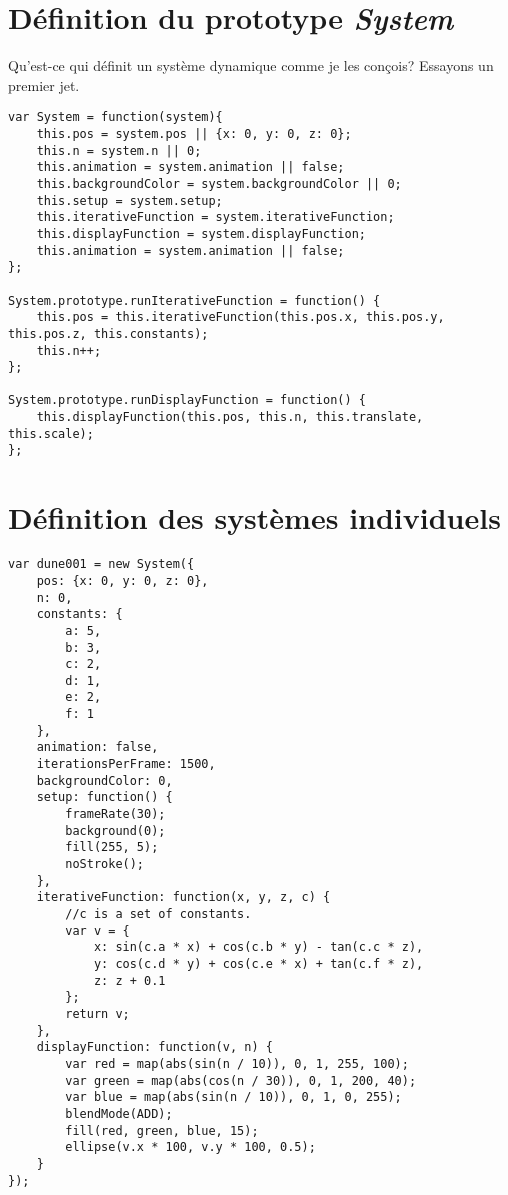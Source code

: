 
\section{Définition du prototype \textit{System}}
Qu'est-ce qui définit un système dynamique comme je les conçois? Essayons un premier jet.

\begin{lstlisting}
var System = function(system){
    this.pos = system.pos || {x: 0, y: 0, z: 0};
    this.n = system.n || 0;
    this.animation = system.animation || false;
    this.backgroundColor = system.backgroundColor || 0;
    this.setup = system.setup;
    this.iterativeFunction = system.iterativeFunction;
    this.displayFunction = system.displayFunction;
    this.animation = system.animation || false;
};

System.prototype.runIterativeFunction = function() {
    this.pos = this.iterativeFunction(this.pos.x, this.pos.y, this.pos.z, this.constants);
    this.n++;
};

System.prototype.runDisplayFunction = function() {
    this.displayFunction(this.pos, this.n, this.translate, this.scale);
};
\end{lstlisting}

\newpage
\section{Définition des systèmes individuels}

\begin{lstlisting}
var dune001 = new System({
    pos: {x: 0, y: 0, z: 0},
    n: 0,
    constants: {
        a: 5,
        b: 3,
        c: 2,
        d: 1,
        e: 2,
        f: 1
    },
    animation: false,
    iterationsPerFrame: 1500,
    backgroundColor: 0,
    setup: function() {
        frameRate(30);
        background(0);
        fill(255, 5);
        noStroke();
    },
    iterativeFunction: function(x, y, z, c) {
        //c is a set of constants.
        var v = {
            x: sin(c.a * x) + cos(c.b * y) - tan(c.c * z),
            y: cos(c.d * y) + cos(c.e * x) + tan(c.f * z),
            z: z + 0.1
        };
        return v;
    },
    displayFunction: function(v, n) {
        var red = map(abs(sin(n / 10)), 0, 1, 255, 100);
        var green = map(abs(cos(n / 30)), 0, 1, 200, 40);
        var blue = map(abs(sin(n / 10)), 0, 1, 0, 255);
        blendMode(ADD);
        fill(red, green, blue, 15);
        ellipse(v.x * 100, v.y * 100, 0.5);
    }
});
\end{lstlisting}

